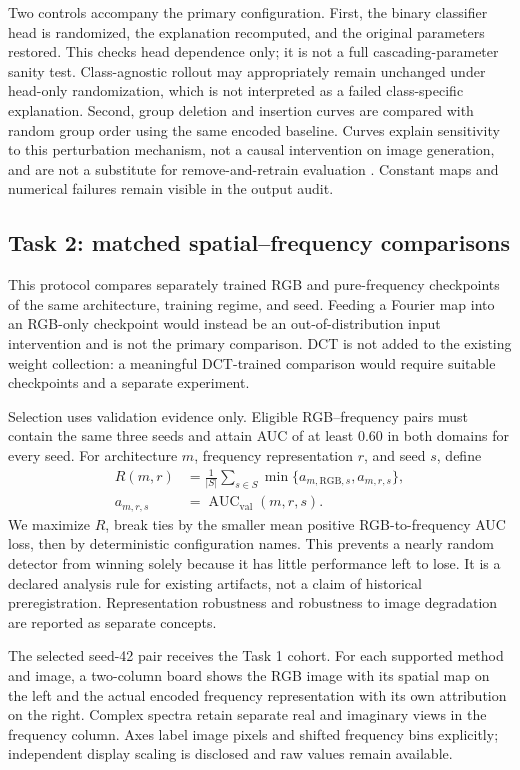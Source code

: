 \documentclass[conference,10pt,letterpaper]{IEEEtran}
\newcommand{\AUC}{\operatorname{AUC}}
\begin{document}
Two controls accompany the primary configuration. First, the binary classifier head is randomized, the explanation recomputed, and the original parameters restored. This checks head dependence only; it is not a full cascading-parameter sanity test. Class-agnostic rollout may appropriately remain unchanged under head-only randomization, which is not interpreted as a failed class-specific explanation. Second, group deletion and insertion curves are compared with random group order using the same encoded baseline. Curves explain sensitivity to this perturbation mechanism, not a causal intervention on image generation, and are not a substitute for remove-and-retrain evaluation \cite{hooker2019}. Constant maps and numerical failures remain visible in the output audit.

\subsection{Task 2: matched spatial--frequency comparisons}
This protocol compares separately trained RGB and pure-frequency checkpoints of the same architecture, training regime, and seed. Feeding a Fourier map into an RGB-only checkpoint would instead be an out-of-distribution input intervention and is not the primary comparison. DCT is not added to the existing weight collection: a meaningful DCT-trained comparison would require suitable checkpoints and a separate experiment.

Selection uses validation evidence only. Eligible RGB--frequency pairs must contain the same three seeds and attain AUC of at least 0.60 in both domains for every seed. For architecture $m$, frequency representation $r$, and seed $s$, define
\begin{equation}
\begin{aligned}
 R(m,r)&=\frac{1}{|S|}\sum_{s\in S}\min\{a_{m,\mathrm{RGB},s},a_{m,r,s}\},\\
 a_{m,r,s}&=\AUC_{\mathrm{val}}(m,r,s).
\end{aligned}
\end{equation}
We maximize $R$, break ties by the smaller mean positive RGB-to-frequency AUC loss, then by deterministic configuration names. This prevents a nearly random detector from winning solely because it has little performance left to lose. It is a declared analysis rule for existing artifacts, not a claim of historical preregistration. Representation robustness and robustness to image degradation are reported as separate concepts.

The selected seed-42 pair receives the Task 1 cohort. For each supported method and image, a two-column board shows the RGB image with its spatial map on the left and the actual encoded frequency representation with its own attribution on the right. Complex spectra retain separate real and imaginary views in the frequency column. Axes label image pixels and shifted frequency bins explicitly; independent display scaling is disclosed and raw values remain available.
\end{document}

